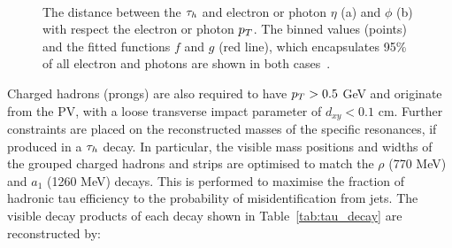 \begin{figure}[!hbtp]
\centering
     \\
\caption{The distance between the $\tau_{h}$ and electron or photon $\eta$ (a) and $\phi$ (b) with respect the electron or photon $p_{T}$. The binned values (points) and the fitted functions $f$ and $g$ (red line), which encapsulates 95\% of all electron and photons are shown in both cases~\cite{Sirunyan:2018pgf}.}
\label{fig:hps}
\end{figure}

Charged hadrons (prongs) are also required to have $p_{T} > 0.5$ GeV and originate from the \ac{PV}, with a loose transverse impact parameter of $d_{xy} < 0.1$ cm.
Further constraints are placed on the reconstructed masses of the specific resonances, if produced in a $\tau_{h}$ decay.
In particular, the visible mass positions and widths of the grouped charged hadrons and strips are optimised to match the $\rho$ (770 MeV) and $a_1$ (1260 MeV) decays.
This is performed to maximise the fraction of hadronic tau efficiency to the probability of misidentification from jets.
The visible decay products of each decay shown in Table~\ref{tab:tau_decay} are reconstructed by:


